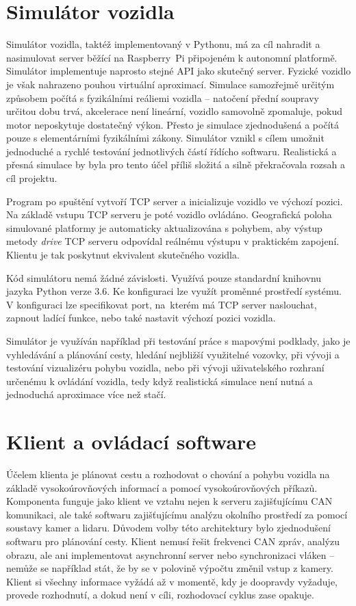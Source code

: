 \documentclass[czech, bachelor]{diploma}
\begin{document}
\chapter{Simulátor vozidla}

Simulátor vozidla, taktéž implementovaný v Pythonu, má za cíl nahradit a nasimulovat server běžící na Raspberry~Pi připojeném
k autonomní platformě. Simulátor implementuje naprosto stejné API jako skutečný server. Fyzické vozidlo je však nahrazeno pouhou
virtuální aproximací. Simulace samozřejmě určitým způsobem počítá s fyzikálními reáliemi vozidla -- natočení přední soupravy
určitou dobu trvá, akcelerace není lineární, vozidlo samovolně zpomaluje, pokud motor neposkytuje dostatečný výkon. Přesto je
simulace zjednodušená a počítá pouze s elementárními fyzikálními zákony. Simulátor vznikl s cílem umožnit jednoduché a rychlé
testování jednotlivých částí řídícho softwaru. Realistická a přesná simulace by byla pro tento účel příliš složitá a silně
překračovala rozsah a cíl projektu.

Program po spuštění vytvoří TCP server a inicializuje vozidlo ve výchozí pozici. Na základě vstupu TCP serveru je poté vozidlo
ovládáno. Geografická poloha simulované platformy je automaticky aktualizována s pohybem, aby výstup metody \emph{drive} TCP
serveru odpovídal reálnému výstupu v praktickém zapojení. Klientu je tak poskytnut ekvivalent skutečného vozidla.

Kód simulátoru nemá žádné závislosti. Využívá pouze standardní knihovnu jazyka Python verze 3.6. Ke konfiguraci lze využít
proměnné prostředí systému. V konfiguraci lze specifikovat port, na~kterém má TCP server naslouchat, zapnout ladící funkce,
nebo také nastavit výchozí pozici vozidla.

Simulátor je využíván například při testování práce s mapovými podklady, jako je vyhledávání a plánování cesty, hledání nejbližší
využitelné vozovky, při vývoji a testování vizualizéru pohybu vozidla, nebo při vývoji uživatelského rozhraní určenému k ovládání
vozidla, tedy když realistická simulace není nutná a jednoduchá aproximace více než stačí.

\chapter{Klient a ovládací software}

Účelem klienta je plánovat cestu a rozhodovat o chování a pohybu vozidla na základě vysokoúrovňových informací a pomocí
vysokoúrovňových příkazů. Komponenta funguje jako klient ve vztahu nejen k serveru zajišťujícímu CAN komunikaci, ale také
softwaru zajišťujícímu analýzu okolního prostředí za pomocí soustavy kamer a lidaru. Důvodem volby této architektury bylo
zjednodušení softwaru pro plánování cesty. Klient nemusí řešit frekvenci CAN zpráv, analýzu obrazu, ale ani implementovat
asynchronní server nebo synchronizaci vláken -- nemůže se například stát, že by se v polovině výpočtu změnil vstup z kamery.
Klient si všechny informace vyžádá až v momentě, kdy je doopravdy vyžaduje, provede rozhodnutí, a dokud není v cíli, rozhodovací
cyklus zase opakuje.
\end{document}
